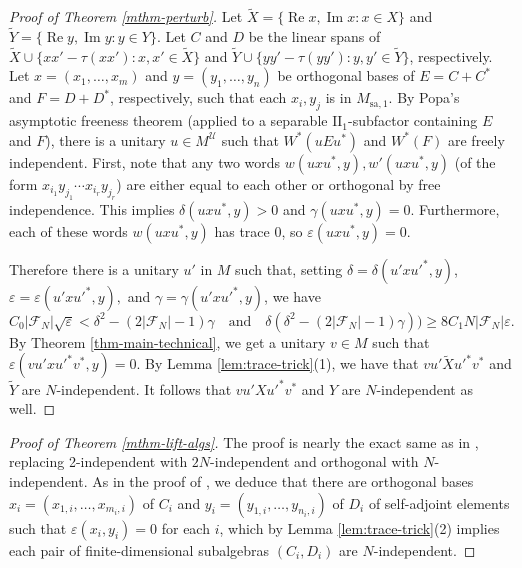 \documentclass[10pt]{amsart}
\numberwithin{equation}{section}
\theoremstyle{definition}
\newcommand{\cF}{\mathcal{F}}
\newcommand{\cU}{\mathcal{U}}
\newcommand{\ee}{\varepsilon}
\begin{document}
\begin{proof}[Proof of Theorem \ref{mthm-perturb}]
    Let $\widetilde X = \{\operatorname{Re} x, \operatorname{Im}x: x \in X\}$ and $\widetilde Y = \{\operatorname{Re} y, \operatorname{Im}y: y \in Y\}$. Let $C$ and $D$ be the linear spans of $\widetilde X \cup \{xx' - \tau(xx') : x,x'\in \widetilde X\}$ and $\widetilde Y \cup \{yy' - \tau(yy'): y,y'\in \widetilde Y\}$, respectively. Let $x=(x_1,\ldots, x_m)$ and $y=(y_1,\ldots, y_n)$ be orthogonal bases of $E = C+C^*$ and $F = D+D^*$, respectively, such that each $x_i,y_j$ is in $M_{\mathrm{sa},1}$. By Popa's asymptotic freeness theorem \cite{popa1995free} 
    (applied to a separable $\mathrm{II}_1$-subfactor containing $E$ and $F$), there is a unitary $u\in M^\cU$ such that $W^*(uEu^*)$ and $W^*(F)$ are freely independent. First, note that any two words $w(uxu^*,y),w'(uxu^*,y)$ (of the form $x_{i_1}y_{j_1}\cdots x_{i_r}y_{j_r}$) are either equal to each other or orthogonal by free independence. This implies $\delta(uxu^*,y)>0$ and $\gamma(uxu^*,y) = 0$. Furthermore, each of these words $w(uxu^*,y)$ has trace 0, so $\ee(uxu^*,y)=0.$

    Therefore there is a unitary $u'$ in $M$ such that, setting $\delta = \delta(u'xu'^*,y)$, $\ee=\ee(u'xu'^*,y),$ and $\gamma = \gamma(u'xu'^*,y)$, we have $$C_0|\cF_N|\sqrt{\ee} < \delta^2 - (2|\cF_N|-1)\gamma \quad \text{and} \quad \delta(\delta^2-(2|\cF_N|-1)\gamma)) \ge 8C_1N|\cF_N|\ee.$$ By Theorem \ref{thm-main-technical}, we get a unitary $v \in M$ such that $\ee(vu'xu'^*v^*,y) = 0$. By Lemma \ref{lem:trace-trick}(1), we have that $vu'\widetilde Xu'^*v^*$ and $\widetilde Y$ are $N$-independent. It follows that $vu'Xu'^*v^*$ and $ Y$ are $N$-independent as well.
\end{proof}



\begin{proof}[Proof of Theorem \ref{mthm-lift-algs}]
    The proof is nearly the exact same as in \cite[Theorem~5.1]{houdayer2023asymptotic}, 
    replacing 2-independent with $2N$-independent and orthogonal with $N$-independent. 
    As in the proof of \cite[Theorem~5.1]{houdayer2023asymptotic}, we deduce that there are orthogonal bases $x_i = (x_{1,i},\ldots,x_{m_i,i})$ of $C_i$ and $y_i = (y_{1,i},\ldots,y_{n_i,i})$ of $D_i$ of self-adjoint elements such that  $\ee(x_i,y_i) = 0$ for each $i$, 
    which by Lemma \ref{lem:trace-trick}(2) implies each pair of finite-dimensional subalgebras $(C_i,D_i)$ are $N$-independent.
\end{proof}
\end{document}
